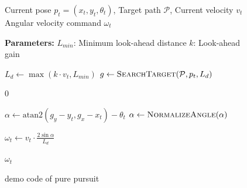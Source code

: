 \begin{figure}[htb]
  \label{alg:pure_pursuit}
  \begin{algorithm}[H]
    \caption{Pure Pursuit Algorithm for Differential Drive Robot}
    \begin{algorithmic}
    \Require Current pose $p_t = (x_t, y_t, \theta_t)$, Target path $\mathcal{P}$, Current velocity $v_t$
    \Ensure Angular velocity command $\omega_t$
    
    \Statex \textbf{Parameters:}
    \Statex \quad $L_{min}$: Minimum look-ahead distance
    \Statex \quad $k$: Look-ahead gain
    
    \State $L_d \gets \max(k \cdot v_t, L_{min})$ 
    \State $g \gets \Call{SearchTarget}{\mathcal{P}, p_t, L_d}$ 
    
        \State \Return $0$ 
    \EndIf
    
    \State $\alpha \gets \mathrm{atan2}(g_y - y_t, g_x - x_t) - \theta_t$ 
    \State $\alpha \gets \Call{NormalizeAngle}{\alpha}$ \Comment{Normalize to $[-\pi, \pi)$}
    
    \State $\omega_t \gets v_t \cdot \frac{2 \sin \alpha}{L_d}$ 
    
    \State \Return $\omega_t$
    \end{algorithmic}
  \end{algorithm}
  \caption{demo code of pure pursuit}
\end{figure}


